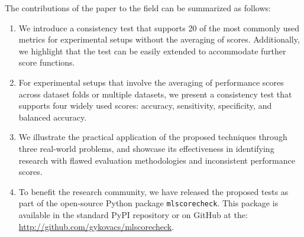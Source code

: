 \documentclass[5p, final]{elsarticle}
\begin{document}
The contributions of the paper to the field can be summarized as follows:
\begin{enumerate}
\item We introduce a consistency test that supports 20 of the most commonly used metrics for experimental setups without the averaging of scores. Additionally, we highlight that the test can be easily extended to accommodate further score functions.
\item For experimental setups that involve the averaging of performance scores across dataset folds or multiple datasets, we present a consistency test that supports four widely used scores: accuracy, sensitivity, specificity, and balanced accuracy.
\item We illustrate the practical application of the proposed techniques through three real-world problems, and showcase its effectiveness in identifying research with flawed evaluation methodologies and inconsistent performance scores.
\item To benefit the research community, we have released the proposed tests as part of the open-source Python package \verb|mlscorecheck|. This package is available in the standard PyPI repository or on GitHub at the: \url{http://github.com/gykovacs/mlscorecheck}.
\end{enumerate}
\end{document}
